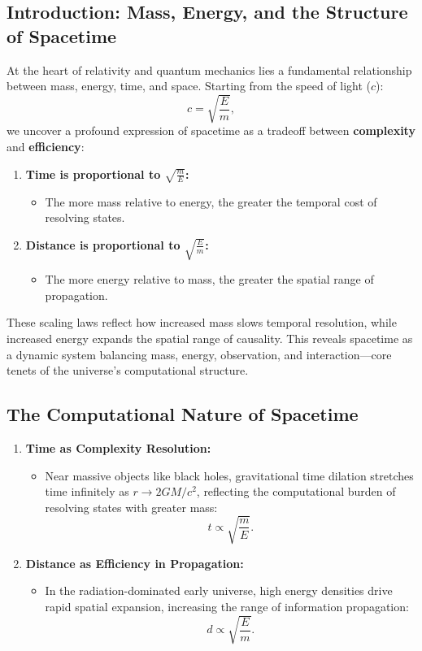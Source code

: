 \documentclass[12pt]{article}
\begin{document}
\subsection{Introduction: Mass, Energy, and the Structure of Spacetime}

At the heart of relativity and quantum mechanics lies a fundamental relationship between mass, energy, time, and space. Starting from the speed of light ($c$):
\[
c = \sqrt{\frac{E}{m}},
\]
we uncover a profound expression of spacetime as a tradeoff between \textbf{complexity} and \textbf{efficiency}:
\begin{enumerate}
    \item \textbf{Time is proportional to $ \sqrt{\frac{m}{E}}$:}
    \begin{itemize}
        \item The more mass relative to energy, the greater the temporal cost of resolving states.
    \end{itemize}

    \item \textbf{Distance is proportional to $ \sqrt{\frac{E}{m}}$:}
    \begin{itemize}
        \item The more energy relative to mass, the greater the spatial range of propagation.
    \end{itemize}
\end{enumerate}

These scaling laws reflect how increased mass slows temporal resolution, while increased energy expands the spatial range of causality. This reveals spacetime as a dynamic system balancing mass, energy, observation, and interaction—core tenets of the universe’s computational structure.

\subsection{The Computational Nature of Spacetime}

\begin{enumerate}
    \item \textbf{Time as Complexity Resolution:}
    \begin{itemize}
        \item Near massive objects like black holes, gravitational time dilation stretches time infinitely as $r \to 2GM/c^2$, reflecting the computational burden of resolving states with greater mass:
        \[
        t \propto \sqrt{\frac{m}{E}}.
        \]
    \end{itemize}

    \item \textbf{Distance as Efficiency in Propagation:}
    \begin{itemize}
        \item In the radiation-dominated early universe, high energy densities drive rapid spatial expansion, increasing the range of information propagation:
        \[
        d \propto \sqrt{\frac{E}{m}}.
        \]
    \end{itemize}
\end{enumerate}
\end{document}
